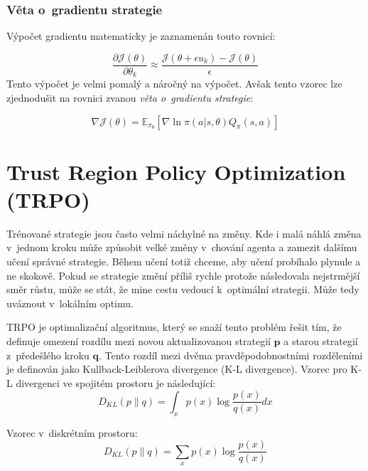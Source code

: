 \subsubsection*{Věta o~gradientu strategie}
Výpočet gradientu matematicky je zaznamenán touto rovnicí:

\begin{equation}
  \label{eq:gradient_strategie}
  \frac{\partial \mathcal{J}(\theta)}{\partial \theta_k} \approx \frac{\mathcal{J}(\theta + \epsilon u_k) - \mathcal{J}(\theta)}{\epsilon}
\end{equation}
Tento výpočet je velmi pomalý a náročný na výpočet.
Avšak tento vzorec lze zjednodušit na rovnici zvanou \emph{věta o~gradientu strategie}:

\begin{equation}
    \label{eq:veta_o_gradientu_strategie}
  \nabla \mathcal{J}(\theta) = \mathbb{E}_{\pi_\theta} [\nabla \ln \pi(a \vert s, \theta) Q_\pi(s, a)]
\end{equation}


\section{Trust Region Policy Optimization (TRPO)}\label{sec:trust-region-policy-optimization}
Trénované strategie jsou často velmi náchylné na změny.
Kde i malá náhlá změna v~jednom kroku může způsobit velké změny v~chování agenta a zamezit dalšímu učení správné strategie.
Během učení totiž chceme, aby učení probíhalo plynule a ne skokově.
Pokud se strategie změní příliš rychle protože následovala nejstrmější směr růstu, může se stát, že mine cestu vedoucí k~optimální strategii.
Může tedy uváznout v~lokálním optimu.

TRPO je optimalizační algoritmus, který se snaží tento problém řešit tím, že definuje omezení rozdílu mezi novou aktualizovanou strategií $\textbf{p}$ a starou strategií z~předešlého kroku $\textbf{q}$.
Tento rozdíl mezi dvěma pravděpodobnostními rozděleními je definován jako Kullback-Leiblerova divergence (K-L divergence)\cite{KL_divergence}.
Vzorec pro K-L divergenci ve spojitém prostoru je následující:
\begin{equation}
  D_{KL}(p \| q) = \int_x p(x) \log \frac{p(x)}{q(x)} dx
\end{equation}

Vzorec v~diskrétním prostoru:
\begin{equation}
  D_{KL}(p \| q) = \sum_x p(x) \log \frac{p(x)}{q(x)}
\end{equation}

